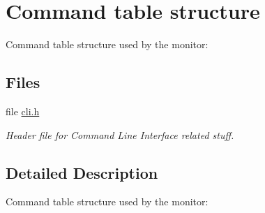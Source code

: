 \hypertarget{group__shared__cli}{}\section{Command table structure}
\label{group__shared__cli}


Command table structure used by the monitor\+:  


\subsection*{Files}
\begin{DoxyCompactItemize}
\item 
file \mbox{\hyperlink{cli_8h}{cli.\+h}}
\begin{DoxyCompactList}\small\item\em Header file for Command Line Interface related stuff. \end{DoxyCompactList}\end{DoxyCompactItemize}


\subsection{Detailed Description}
Command table structure used by the monitor\+: 

